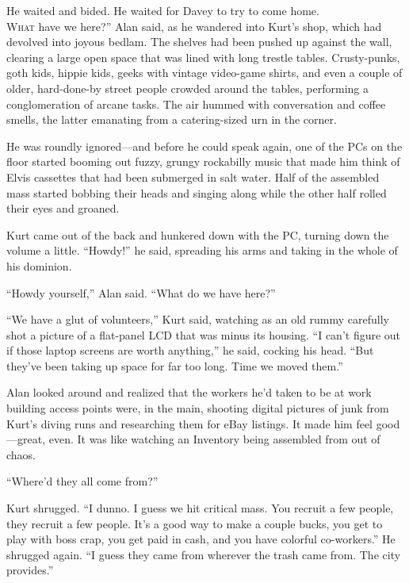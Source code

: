 He waited and bided.  He waited for Davey to try to come home.
\\
\lettrine[lines=3, lhang=.5, nindent=0pt, findent=2pt]{W}{hat}
have we here?'' Alan said, as he wandered into Kurt's shop,
which had devolved into joyous bedlam.  The shelves had been pushed up
against the wall, clearing a large open space that was lined with long
trestle tables.  Crusty-punks, goth kids, hippie kids, geeks with
vintage video-game shirts, and even a couple of older, hard-done-by
street people crowded around the tables, performing a conglomeration
of arcane tasks.  The air hummed with conversation and coffee smells,
the latter emanating from a catering-sized urn in the corner.

He was roundly ignored---and before he could speak again, one of the
PCs on the floor started booming out fuzzy, grungy rockabilly music
that made him think of Elvis cassettes that had been submerged in salt
water.  Half of the assembled mass started bobbing their heads and
singing along while the other half rolled their eyes and groaned.

Kurt came out of the back and hunkered down with the PC, turning down
the volume a little.  ``Howdy!'' he said, spreading his arms and
taking in the whole of his dominion.

``Howdy yourself,'' Alan said.  ``What do we have here?''

``We have a glut of volunteers,'' Kurt said, watching as an old rummy
carefully shot a picture of a flat-panel LCD that was minus its
housing.  ``I can't figure out if those laptop screens are worth
anything,'' he said, cocking his head.  ``But they've been taking up
space for far too long.  Time we moved them.''

Alan looked around and realized that the workers he'd taken to be at
work building access points were, in the main, shooting digital
pictures of junk from Kurt's diving runs and researching them for eBay
listings.  It made him feel good---great, even.  It was like watching
an Inventory being assembled from out of chaos.

``Where'd they all come from?''

Kurt shrugged.  ``I dunno.  I guess we hit critical mass.  You recruit
a few people, they recruit a few people.  It's a good way to make a
couple bucks, you get to play with boss crap, you get paid in cash,
and you have colorful co-workers.'' He shrugged again.  ``I guess they
came from wherever the trash came from.  The city provides.''

